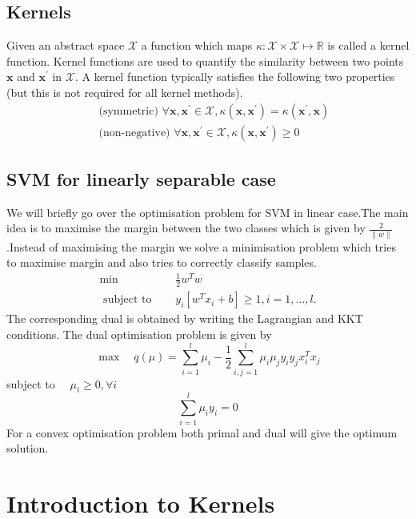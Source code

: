 \documentclass[../main.tex]{subfiles}
\begin{document}
    \subsection{Kernels}
Given an abstract space $\mathcal{X}$ a function which maps $\kappa: \mathcal{X} \times \mathcal{X} \mapsto \mathbb{R}$ is called a kernel function. Kernel functions are used to quantify the similarity between two points $\mathbf{x}$ and $\mathbf{x}^{\prime}$ in $\mathcal{X}$.
A kernel function typically satisfies the following two properties (but this is not required for all kernel methods). 
$$
\begin{aligned}
&\text { (symmetric) } \forall \mathbf{x}, \mathbf{x}^{\prime} \in \mathcal{X}, \kappa\left(\mathbf{x}, \mathbf{x}^{\prime}\right)=\kappa\left(\mathbf{x}^{\prime}, \mathbf{x}\right) \\
&\text { (non-negative) } \forall \mathbf{x}, \mathbf{x}^{\prime} \in \mathcal{X}, \kappa\left(\mathbf{x}, \mathbf{x}^{\prime}\right) \geq 0
\end{aligned}
$$

    \subsection{SVM for linearly separable case}
We will briefly go over the optimisation problem for SVM in linear case.The main idea is to maximise the margin between the two classes which is given by $\frac{2}{\|w\|}$.Instead of maximising the margin we solve a minimisation problem which tries to maximise margin and also tries to correctly classify samples.
$$\begin{aligned}
\min \quad & \frac{1}{2} w^{T} w \\
\text { subject to } \quad & y_{i}\left[w^{T} x_{i}+b\right] \geq 1, i=1, \ldots, l .
\end{aligned}$$
The corresponding dual is obtained by writing the Lagrangian and KKT conditions. The dual optimisation problem is given by $$
\max \quad q(\mu)=\sum_{i=1}^{l} \mu_{i}-\frac{1}{2} \sum_{i, j=1}^{l} \mu_{i} \mu_{j} y_{i} y_{j} x_{i}^{T} x_{j}
$$
subject to $\quad \mu_{i} \geq 0, \forall i$
$$
\sum_{i=1}^{l} \mu_{i} y_{i}=0
$$
For a convex optimisation problem both primal and dual will give the optimum solution.

\section{Introduction to Kernels}
\end{document}
